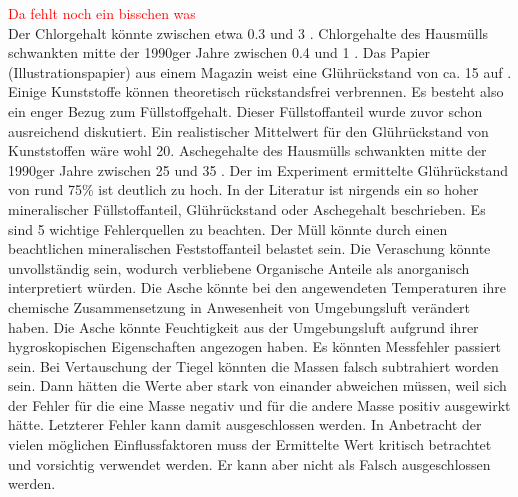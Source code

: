 \textcolor{red}{Da fehlt noch ein bisschen was}\\
Der Chlorgehalt könnte zwischen etwa \SI{0,3}{\mpercent} und \SI{3}{\mpercent} \cite{LLA_Abfallanalyse}. Chlorgehalte des Hausmülls schwankten mitte der 1990ger Jahre zwischen \SI{0,4}{\mpercent} und \SI{1}{\mpercent} \cite{scholz2013}.
Das Papier (Illustrationspapier) aus einem Magazin weist eine Glührückstand von ca. \SI{15}{\mpercent} auf \cite{roempppap}. Einige Kunststoffe können theoretisch rückstandsfrei verbrennen. Es besteht also ein enger Bezug zum Füllstoffgehalt. Dieser Füllstoffanteil wurde zuvor schon ausreichend diskutiert. Ein realistischer Mittelwert für den Glührückstand von Kunststoffen wäre wohl \SI{20}{\mpercent}.
Aschegehalte des Hausmülls schwankten mitte der 1990ger Jahre zwischen \SI{25}{\mpercent} und \SI{35}{\mpercent} \cite{scholz2013}.
Der im Experiment ermittelte Glührückstand von rund 75\% ist deutlich zu hoch. In der Literatur ist nirgends ein so hoher mineralischer Füllstoffanteil, Glührückstand oder Aschegehalt beschrieben. Es sind 5 wichtige Fehlerquellen zu beachten. Der Müll könnte durch einen beachtlichen mineralischen Feststoffanteil belastet sein. Die Veraschung könnte unvollständig sein, wodurch verbliebene Organische Anteile als anorganisch interpretiert würden. Die Asche könnte bei den angewendeten Temperaturen ihre chemische Zusammensetzung in Anwesenheit von Umgebungsluft verändert haben. Die Asche könnte Feuchtigkeit aus der Umgebungsluft aufgrund ihrer hygroskopischen Eigenschaften angezogen haben. Es könnten Messfehler passiert sein. Bei Vertauschung der Tiegel könnten die Massen falsch subtrahiert worden sein. Dann hätten die Werte aber stark von einander abweichen müssen, weil sich der Fehler für die eine Masse negativ und für die andere Masse positiv ausgewirkt hätte. Letzterer Fehler kann damit ausgeschlossen werden. 
In Anbetracht der vielen möglichen Einflussfaktoren muss der Ermittelte Wert kritisch betrachtet und vorsichtig verwendet werden. Er kann aber nicht als Falsch ausgeschlossen werden.
